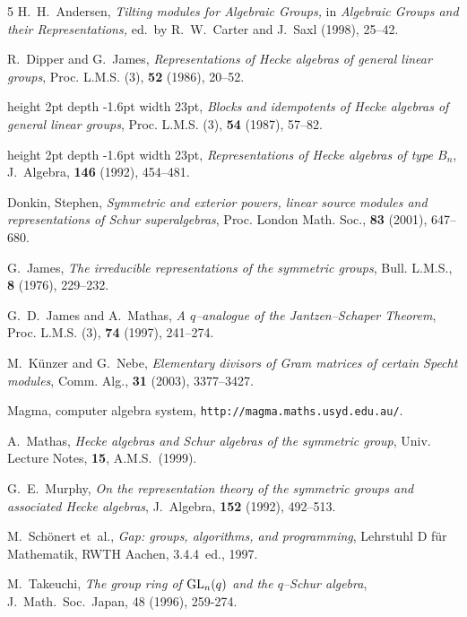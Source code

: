 \documentclass[twoside]{amsart}
\numberwithin{equation}{section}
\theoremstyle{remark}
\def\GL{\mathop{\rm GL}\nolimits}
\begin{document}
\let\em\it
\begin{thebibliography}{5}
{\sc H.~H.~Andersen}, {\em Tilting modules for Algebraic Groups,} in {\it Algebraic 
Groups and their Representations,} ed.\ by R.~W.~Carter and J.~Saxl (1998), 25--42.

{\sc R.~Dipper and G.~James}, {\em Representations of {Hecke} algebras of
  general linear groups}, Proc. L.M.S. (3), {\bf 52} (1986), 20--52.

\leavevmode\vrule height 2pt depth -1.6pt width 23pt,
{\it Blocks and idempotents of {Hecke} algebras of general linear groups},
{Proc. L.M.S. (3)}, \textbf{54} (1987), {57--82}.

\leavevmode\vrule height 2pt depth -1.6pt width 23pt, {\em Representations of
  {Hecke} algebras of type {$B_n$}}, J.~Algebra, {\bf 146} (1992), 454--481.

{\sc Donkin, Stephen},
{\it Symmetric and exterior powers, linear source modules and
              representations of {S}chur superalgebras},
Proc. London Math. Soc., \textbf{83} (2001), 647--680.

{\sc G.\ James,} {\it The irreducible representations of the symmetric groups},
Bull. L.M.S., \textbf{8} (1976), 229--232.

{\sc G.~D.~James and A.~Mathas}, 
{\it A $q$--analogue of the {Jantzen--Schaper} Theorem},
{Proc. L.M.S. (3)}, \textbf{74} (1997), 241--274.

{\sc M.~K\"unzer and G.~Nebe}, {\it Elementary divisors of Gram
matrices of certain Specht modules}, Comm. Alg., \textbf{31} (2003),  
3377--3427.

{\sc Magma,} computer algebra system, {\tt http://magma.maths.usyd.edu.au/}.

{\sc A.~Mathas}, {\em {Hecke algebras and Schur algebras of the symmetric
  group}}, Univ. Lecture Notes, {\bf 15}, A.M.S.\ (1999).

{\sc G.~E.~Murphy}, {\em On the representation theory of the symmetric groups
  and associated {Hecke} algebras}, J.~Algebra, {\bf 152} (1992), 492--513.

{\sc M.~Sch\"onert et~al.}, {\em Gap: groups, algorithms, and programming},
  Lehrstuhl D f\"ur Mathematik, RWTH Aachen, 3.4.4~ed., 1997.

{\sc M.~Takeuchi,} {\em The group ring of $\GL_n(q)$ and the $q$--Schur
algebra}, J.\ Math.\ Soc.\ Japan, 48 (1996), 259-274.  
 
\end{thebibliography}

\end{document}
